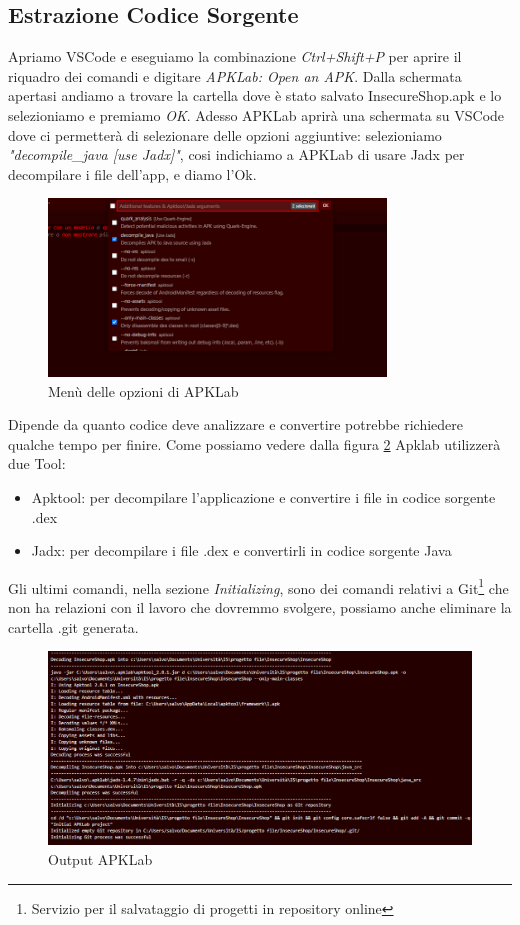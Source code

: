\documentclass{article}
\begin{document}
\subsection{Estrazione Codice Sorgente}
Apriamo VSCode e eseguiamo la combinazione \textit{Ctrl+Shift+P} per aprire il riquadro dei comandi e digitare \textit{APKLab: Open an APK}.
Dalla schermata apertasi andiamo a trovare la cartella dove è stato salvato InsecureShop.apk e lo selezioniamo e premiamo \textit{OK}. 
Adesso APKLab aprirà una schermata su VSCode dove ci permetterà di selezionare delle opzioni aggiuntive:
selezioniamo \textit{"decompile\_java [use Jadx]"}, cosi indichiamo a APKLab di usare Jadx per decompilare i file dell'app, e diamo l'Ok.
\begin{figure}[t]
    \centering
    \includegraphics[width=0.8\textwidth]{./insecureshop/apklaboption.png}
    \captionsetup{labelformat=empty}
    \caption{Menù delle opzioni di APKLab}
    \label{fig:apklabOption}
\end{figure}

Dipende da quanto codice deve analizzare e convertire potrebbe richiedere qualche tempo per finire. Come possiamo vedere dalla figura \ref{fig:apklaboutput}
 Apklab utilizzerà due Tool:
\begin{itemize}
    \item Apktool: per decompilare l'applicazione e convertire i file in codice sorgente .dex
    \item Jadx: per decompilare i file .dex e convertirli in codice sorgente Java
\end{itemize}
Gli ultimi comandi, nella sezione \emph{Initializing}, sono dei comandi relativi a Git\footnote{Servizio per il salvataggio di
progetti in repository online} che non ha relazioni con il lavoro che dovremmo svolgere, possiamo anche eliminare la cartella .git generata.
\begin{figure}[hp]
    \centering
    \includegraphics[width=1\textwidth]{./insecureshop/OutputApkLab.png}
    \captionsetup{labelformat=empty}
    \caption{Output APKLab}
    \label{fig:apklaboutput}
\end{figure}
\end{document}
